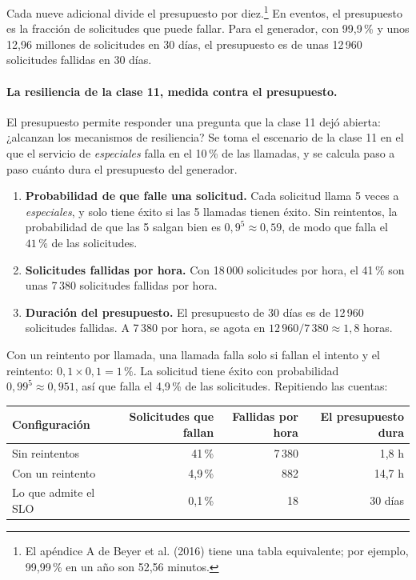 \documentclass[variant=apuntes,cover=institutional,mode=screen]{ua-engineering-v6-article}
\begin{document}
Cada nueve adicional divide el presupuesto por diez.\footnote{El apéndice A de Beyer et al. (2016) tiene una tabla equivalente; por ejemplo, 99,99\,\% en un año son 52,56 minutos.} En eventos, el presupuesto es la fracción de solicitudes que puede fallar. Para el generador, con 99,9\,\% y unos 12{,}96 millones de solicitudes en 30 días, el presupuesto es de unas 12\,960 solicitudes fallidas en 30 días.

\paragraph{La resiliencia de la clase 11, medida contra el presupuesto.} El presupuesto permite responder una pregunta que la clase 11 dejó abierta: ¿alcanzan los mecanismos de resiliencia? Se toma el escenario de la clase 11 en el que el servicio de \emph{especiales} falla en el 10\,\% de las llamadas, y se calcula paso a paso cuánto dura el presupuesto del generador.

\begin{enumerate}
\item \textbf{Probabilidad de que falle una solicitud.} Cada solicitud llama 5 veces a \emph{especiales}, y solo tiene éxito si las 5 llamadas tienen éxito. Sin reintentos, la probabilidad de que las 5 salgan bien es $0{,}9^5 \approx 0{,}59$, de modo que falla el $41\,\%$ de las solicitudes.
\item \textbf{Solicitudes fallidas por hora.} Con 18\,000 solicitudes por hora, el 41\,\% son unas 7\,380 solicitudes fallidas por hora.
\item \textbf{Duración del presupuesto.} El presupuesto de 30 días es de 12\,960 solicitudes fallidas. A 7\,380 por hora, se agota en $12\,960 / 7\,380 \approx 1{,}8$ horas.
\end{enumerate}

Con un reintento por llamada, una llamada falla solo si fallan el intento y el reintento: $0{,}1 \times 0{,}1 = 1\,\%$. La solicitud tiene éxito con probabilidad $0{,}99^5 \approx 0{,}951$, así que falla el 4,9\,\% de las solicitudes. Repitiendo las cuentas:

\begin{center}
\begin{tabular}{lrrr}
\toprule
\textbf{Configuración} & \textbf{Solicitudes que fallan} & \textbf{Fallidas por hora} & \textbf{El presupuesto dura} \\
\midrule
Sin reintentos & 41\,\% & 7\,380 & 1,8 h \\
Con un reintento & 4,9\,\% & 882 & 14,7 h \\
Lo que admite el SLO & 0,1\,\% & 18 & 30 días \\
\bottomrule
\end{tabular}
\end{center}
\end{document}
